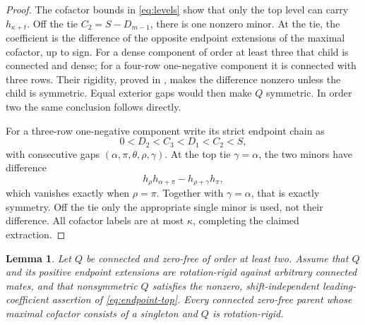 \documentclass[11pt,a4paper]{amsart}
\numberwithin{equation}{section}
\theoremstyle{plain}
\newtheorem{lemma}[theorem]{Lemma}
\theoremstyle{definition}
\begin{document}
\begin{proof}
The cofactor bounds in \eqref{eq:levels} show that only the top level can
carry \(h_{\kappa+t}\).  Off the tie \(C_2=S-D_{m-1}\), there
is one nonzero minor.  At the tie, the coefficient is the difference of
the opposite endpoint extensions of the maximal cofactor, up to sign.
For a dense component of order at least three that child is connected and
dense; for a four-row one-negative component it is connected with three
rows.  Their rigidity, proved in , makes the difference
nonzero unless the child is symmetric.  Equal exterior gaps would then
make \(Q\) symmetric.  In order two the same conclusion follows directly.

For a three-row one-negative component write its strict endpoint chain as
\[
 0<D_2<C_3<D_1<C_2<S,
\]
with consecutive gaps \((\alpha,\pi,\theta,\rho,\gamma)\).
At the top tie \(\gamma=\alpha\), the two minors have difference
\[
 h_\rho h_{\alpha+\pi}-h_{\rho+\gamma}h_\pi,
\]
which vanishes exactly when \(\rho=\pi\).  Together with
\(\gamma=\alpha\), that is exactly symmetry.  Off the tie only the
appropriate single minor is used, not their difference.  All cofactor
labels are at most \(\kappa\), completing the claimed extraction.
\end{proof}

\begin{lemma}\label{lem:singleton-lift}
Let \(Q\) be connected and zero-free of order at least two.  Assume that
\(Q\) and its positive endpoint extensions are rotation-rigid against
arbitrary connected mates, and that nonsymmetric \(Q\) satisfies the
nonzero, shift-independent leading-coefficient assertion of
\eqref{eq:endpoint-top}.  Every connected zero-free parent whose maximal
cofactor consists of a singleton and \(Q\) is rotation-rigid.
\end{lemma}
\end{document}
